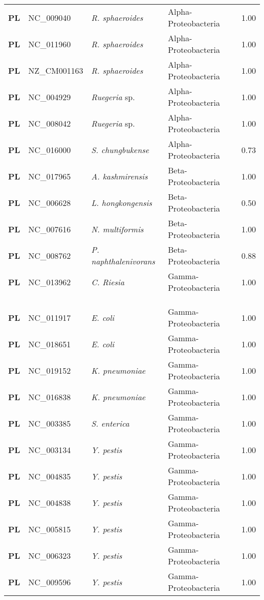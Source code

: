 \begin{adjustwidth}{-3cm}{2cm}
{\begin{supertabular}{>{\bfseries}l|p{0.1\textwidth}p{0.14\textwidth}l|l}
PL & NC\_009040 & \textit{R. sphaeroides} & Alpha-Proteobacteria & 1.00\\
PL & NC\_011960 & \textit{R. sphaeroides} & Alpha-Proteobacteria & 1.00\\
PL & NZ\_CM001163 & \textit{R. sphaeroides} & Alpha-Proteobacteria & 1.00\\
PL & NC\_004929 & \textit{Ruegeria} sp. & Alpha-Proteobacteria & 1.00\\
PL & NC\_008042 & \textit{Ruegeria} sp. & Alpha-Proteobacteria & 1.00\\
PL & NC\_016000 & \textit{S. chungbukense} & Alpha-Proteobacteria & 0.73\\
PL & NC\_017965 & \textit{A. kashmirensis} & Beta-Proteobacteria & 1.00\\
PL & NC\_006628 & \textit{L. hongkongensis} & Beta-Proteobacteria & 0.50\\
PL & NC\_007616 & \textit{N. multiformis} & Beta-Proteobacteria & 1.00\\
PL & NC\_008762 & \textit{P. naphthalenivorans} & Beta-Proteobacteria & 0.88\\
PL & NC\_013962 & \textit{C. Riesia} & Gamma-Proteobacteria & 1.00\\
\\
\\
\hline\\
PL & NC\_011917 & \textit{E. coli} & Gamma-Proteobacteria & 1.00\\
PL & NC\_018651 & \textit{E. coli} & Gamma-Proteobacteria & 1.00\\
PL & NC\_019152 & \textit{K. pneumoniae} & Gamma-Proteobacteria & 1.00\\
PL & NC\_016838 & \textit{K. pneumoniae} & Gamma-Proteobacteria & 1.00\\
PL & NC\_003385 & \textit{S. enterica} & Gamma-Proteobacteria & 1.00\\
PL & NC\_003134 & \textit{Y. pestis} & Gamma-Proteobacteria & 1.00\\
PL & NC\_004835 & \textit{Y. pestis} & Gamma-Proteobacteria & 1.00\\
PL & NC\_004838 & \textit{Y. pestis} & Gamma-Proteobacteria & 1.00\\
PL & NC\_005815 & \textit{Y. pestis} & Gamma-Proteobacteria & 1.00\\
PL & NC\_006323 & \textit{Y. pestis} & Gamma-Proteobacteria & 1.00\\
PL & NC\_009596 & \textit{Y. pestis} & Gamma-Proteobacteria & 1.00\\

\end{supertabular}}
\end{adjustwidth}
